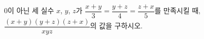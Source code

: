 \hspace*{2mm}\begin{minipage}[t]{\dimexpr\linewidth-2mm\relax}\vspace{0pt}
$0$이 아닌 세 실수 $x$, $y$, $z$가 $\dfrac{x+y}{3}=\dfrac{y+z}{4}=\dfrac{z+x}{5}$를 만족시킬 때, $\dfrac{(x+y)(y+z)(z+x)}{xyz}$의 값을 구하시오.\end{minipage}
